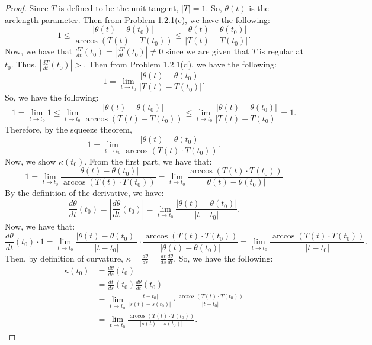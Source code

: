 \documentclass[12pt]{article}
\newcommand\abs[1]{\left| #1 \right|}
\newcommand\parens[1]{\left( #1 \right)}
\newcommand\solproof[1]{\begin{mdframed}
\begin{proof} #1
\end{proof}
\end{mdframed}}
\begin{document}
\solproof{
    Since $T$ is defined to be the unit tangent, $|T| = 1$. So, $\theta(t)$ is the arclength parameter. Then from Problem 1.2.1(e), we have the following:
    \[1 \leq \frac{\abs{\theta\parens{t} - \theta\parens{t_0}}}{\arccos\parens{T\parens{t} - T\parens{t_0}}} \leq \frac{\abs{\theta\parens{t} - \theta\parens{t_0}}}{\abs{T\parens{t} - T\parens{t_0}}}.\]
    Now, we have that $\frac{dT}{dt}\parens{t_0} = \abs{\frac{dT}{dt}\parens{t_0}} \neq 0$ since we are given that $T$ is regular at $t_0$. Thus, $\abs{\frac{dT}{dt}\parens{t_0}} > $. Then from Problem 1.2.1(d), we have the following:
    \[1 = \lim_{t \rightarrow t_0} \frac{\abs{\theta\parens{t} - \theta\parens{t_0}}}{\abs{T\parens{t} - T\parens{t_0}}}.\]
    So, we have the following:
    \[1 = \lim_{t \rightarrow t_0} 1 \leq \lim_{t \rightarrow t_0} \frac{\abs{\theta\parens{t} - \theta\parens{t_0}}}{\arccos\parens{T\parens{t} - T\parens{t_0}}} \leq \lim_{t \rightarrow t_0} \frac{\abs{\theta\parens{t} - \theta\parens{t_0}}}{\abs{T\parens{t} - T\parens{t_0}}} = 1.\]
    Therefore, by the squeeze theorem,
    \[1 = \lim_{t \rightarrow t_0} \frac{\abs{\theta\parens{t} - \theta\parens{t_0}}}{\arccos\parens{T\parens{t} \cdot T\parens{t_0}}}.\]
    Now, we show $\kappa\parens{t_0}$. From the first part, we have that:
    \[1 = \lim_{t \rightarrow t_0} \frac{\abs{\theta\parens{t} - \theta\parens{t_0}}}{\arccos\parens{T\parens{t} \cdot T\parens{t_0}}} = \lim_{t \rightarrow t_0} \frac{\arccos\parens{T\parens{t} \cdot T\parens{t_0}}}{\abs{\theta\parens{t} - \theta\parens{t_0}}}\]
    By the definition of the derivative, we have:
    \[\frac{d\theta}{dt}\parens{t_0} = \abs{\frac{d\theta}{dt}\parens{t_0}} = \lim_{t \rightarrow t_0} \frac{\abs{\theta\parens{t} - \theta\parens{t_0}}}{\abs{t - t_0}}.\]
    Now, we have that:
    \[\frac{d\theta}{dt}\parens{t_0} \cdot 1 = \lim_{t \rightarrow t_0} \frac{\abs{\theta\parens{t} - \theta\parens{t_0}}}{\abs{t - t_0}} \cdot \frac{\arccos\parens{T\parens{t} \cdot T\parens{t_0}}}{\abs{\theta\parens{t} - \theta\parens{t_0}}} = \lim_{t \rightarrow t_0} \frac{\arccos\parens{T\parens{t} \cdot T\parens{t_0}}}{\abs{t - t_0}}.\]
    Then, by definition of curvature, $\kappa = \frac{d\theta}{ds} = \frac{dt}{ds}\frac{d\theta}{dt}$. So, we have the following:
    \begin{align*}
        \kappa\parens{t_0} &= \frac{d\theta}{ds}\parens{t_0} \\
        &= \frac{dt}{ds}\parens{t_0}\frac{d\theta}{dt}\parens{t_0} \\
        &= \lim_{t \rightarrow t_0} \frac{\abs{t - t_0}}{\abs{s\parens{t} - s\parens{t_0}}} \cdot \frac{\arccos\parens{T\parens{t} \cdot T\parens{t_0}}}{\abs{t - t_0}} \\
        &= \lim_{t \rightarrow t_0} \frac{\arccos\parens{T\parens{t} \cdot T\parens{t_0}}}{\abs{s\parens{t} - s\parens{t_0}}}.
    \end{align*}
}
\end{document}
